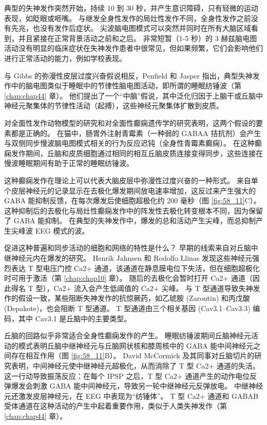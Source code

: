 典型的失神发作突然开始，持续 10 到 30 秒，并产生意识障碍，只有轻微的运动表现，如眨眼或咂嘴。
与继发全身性发作的局灶性发作不同，全身性发作之前没有先兆，也没有发作后症状。
尖波脑电图模式可以突然并同时在所有大脑区域看到，并且紧接在正常背景活动之前和之后。 非常短暂（1-5 秒）的 3 赫兹脑电图活动没有明显的临床症状在失神发作患者中很常见，但如果频繁，它们会影响他们进行正常活动的能力，例如学校表现。


与 Gibbs 的弥漫性皮层过度兴奋假说相反，Penfield 和 Jasper 指出，典型失神发作中的脑电图类似于睡眠中的节律性脑电图活动，即所谓的睡眠纺锤波（第 \ref{chap:chap44} 章）。
他们提出了一个“中脑”假说，其中泛化归因于上脑干或丘脑中神经元聚集体的节律性活动（起搏），这些神经元聚集体扩散到皮质。


对全面性发作动物模型的研究和对全面性癫痫遗传学的研究表明，这两个假设的要素都是正确的。
在猫中，肠胃外注射青霉素（一种弱的 GABAA 拮抗剂）会产生与双侧同步慢波脑电图模式相关的行为反应迟钝（全身性青霉素癫痫）。
在这种癫痫发作期间，丘脑和皮质细胞通过相同的相互丘脑皮质连接变得同步，这些连接在慢波睡眠期间有助于正常的睡眠纺锤波。


这种癫痫发作在理论上可以代表大脑皮层中弥漫性过度兴奋的一种形式。
来自单个皮层神经元的记录显示在去极化爆发期间放电速率增加，这反过来产生强大的 GABA 能抑制反馈，在每次爆发后使细胞超极化约 200 毫秒（图 \ref{fig:58_11}C）。
这种抑制后的去极化与局灶性癫痫发作中的阵发性去极化转变根本不同，因为保留了 GABA 能抑制。
在典型的失神发作中，爆发的总和活动产生尖峰，而总抑制产生尖峰波 EEG 模式的波。


促进这种普遍和同步活动的细胞和网络的特性是什么？
早期的线索来自对丘脑中继神经元内在爆发的研究。
Henrik Jahnsen 和 Rodolfo Llinas 发现这些神经元强烈表达 T 型电压门控 Ca2+ 通道，该通道在静息膜电位下失活，但在细胞超极化时可用于激活（第 \ref{chap:chap10} 章）。
随后的去极化会暂时打开 Ca2+ 通道（因此得名 T 型），Ca2+ 流入会产生低阈值的 Ca2+ 尖峰。
与 T 型通道导致失神发作的假设一致，某些阻断失神发作的抗惊厥药，如乙琥胺 (Zarontin) 和丙戊酸 (Depakote)，也会阻断 T 型通道。
T 型通道由三个相关基因 (Cav3.1–Cav3.3) 编码，其中 Cav3.1 是丘脑中的主要类型。


丘脑的回路似乎非常适合全身性癫痫发作的产生。
睡眠纺锤波期间丘脑神经元活动的模式表明丘脑中继神经元与丘脑网状核和膝周核中的 GABA 能中间神经元之间存在相互作用（图 \ref{fig:58_11}B）。
David McCormick 及其同事对丘脑切片的研究表明，中间神经元使中继神经元超极化，从而消除了 T 型 Ca2+ 通道的失活。
这一行动导致振荡反应：在每个 IPSP 之后，T 型 Ca2+ 通道产生的动作电位反弹爆发会刺激 GABA 能中间神经元，导致另一轮中继神经元反弹放电。
中继神经元还激发皮层神经元，在 EEG 中表现为“纺锤体”。
T 型 Ca2+ 通道和 GABAB 受体通道在这种活动的产生中起着重要作用，类似于人类失神发作（第 \ref{chap:chap44} 章）。


